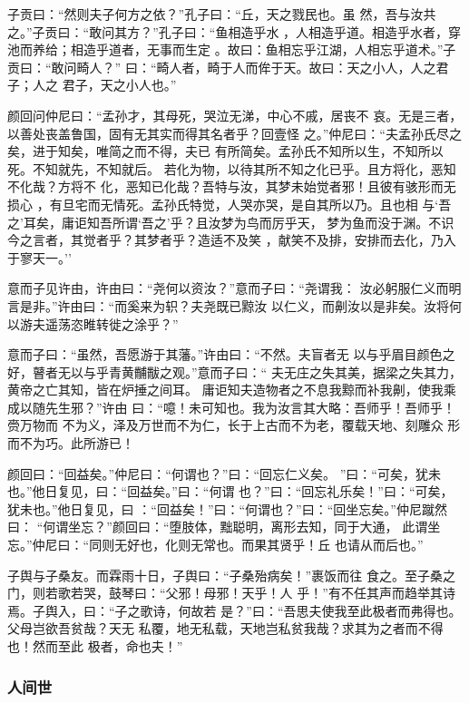 \documentclass[]{article}
\begin{document}
子贡曰：``然则夫子何方之依？''孔子曰：``丘，天之戮民也。虽
然，吾与汝共之。''子贡曰：``敢问其方？''孔子曰：``鱼相造乎水
，人相造乎道。相造乎水者，穿池而养给；相造乎道者，无事而生定
。故曰：鱼相忘乎江湖，人相忘乎道术。''子贡曰：``敢问畸人？''
曰：``畸人者，畸于人而侔于天。故曰：天之小人，人之君子；人之
君子，天之小人也。''

颜回问仲尼曰：``孟孙才，其母死，哭泣无涕，中心不戚，居丧不
哀。无是三者，以善处丧盖鲁国，固有无其实而得其名者乎？回壹怪
之。''仲尼曰：``夫孟孙氏尽之矣，进于知矣，唯简之而不得，夫已
有所简矣。孟孙氏不知所以生，不知所以死。不知就先，不知就后。
若化为物，以待其所不知之化已乎。且方将化，恶知不化哉？方将不
化，恶知已化哉？吾特与汝，其梦未始觉者邪！且彼有骇形而无损心
，有旦宅而无情死。孟孙氏特觉，人哭亦哭，是自其所以乃。且也相
与`吾之'耳矣，庸讵知吾所谓`吾之'乎？且汝梦为鸟而厉乎天，
梦为鱼而没于渊。不识今之言者，其觉者乎？其梦者乎？造适不及笑
，献笑不及排，安排而去化，乃入于寥天一。''

意而子见许由，许由曰：``尧何以资汝？''意而子曰：``尧谓我：
汝必躬服仁义而明言是非。''许由曰：``而奚来为轵？夫尧既已黥汝
以仁义，而劓汝以是非矣。汝将何以游夫遥荡恣睢转徙之涂乎？''

意而子曰：``虽然，吾愿游于其藩。''许由曰：``不然。夫盲者无
以与乎眉目颜色之好，瞽者无以与乎青黄黼黻之观。''意而子曰：``
夫无庄之失其美，据梁之失其力，黄帝之亡其知，皆在炉捶之间耳。
庸讵知夫造物者之不息我黥而补我劓，使我乘成以随先生邪？''许由
曰：``噫！未可知也。我为汝言其大略：吾师乎！吾师乎！赍万物而
不为义，泽及万世而不为仁，长于上古而不为老，覆载天地、刻雕众
形而不为巧。此所游已！

颜回曰：``回益矣。''仲尼曰：``何谓也？''曰：``回忘仁义矣。
''曰：``可矣，犹未也。''他日复见，曰：``回益矣。''曰：``何谓
也？''曰：``回忘礼乐矣！''曰：``可矣，犹未也。''他日复见，曰
：``回益矣！''曰：``何谓也？''曰：``回坐忘矣。''仲尼蹴然曰：
``何谓坐忘？''颜回曰：``堕肢体，黜聪明，离形去知，同于大通，
此谓坐忘。''仲尼曰：``同则无好也，化则无常也。而果其贤乎！丘
也请从而后也。''

子舆与子桑友。而霖雨十日，子舆曰：``子桑殆病矣！''裹饭而往
食之。至子桑之门，则若歌若哭，鼓琴曰：``父邪！母邪！天乎！人
乎！''有不任其声而趋举其诗焉。子舆入，曰：``子之歌诗，何故若
是？''曰：``吾思夫使我至此极者而弗得也。父母岂欲吾贫哉？天无
私覆，地无私载，天地岂私贫我哉？求其为之者而不得也！然而至此
极者，命也夫！''

\hypertarget{header-n592}{%
\subsubsection{人间世}\label{header-n592}}
\end{document}
